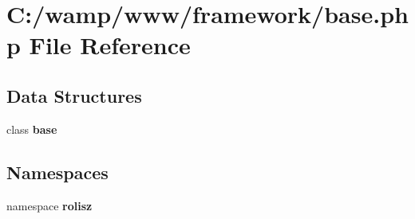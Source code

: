 \section{C:/wamp/www/framework/base.php File Reference}
\label{base_8php}
\subsection*{Data Structures}
\begin{DoxyCompactItemize}
\item 
class {\bf base}
\end{DoxyCompactItemize}
\subsection*{Namespaces}
\begin{DoxyCompactItemize}
\item 
namespace {\bf rolisz}
\end{DoxyCompactItemize}
